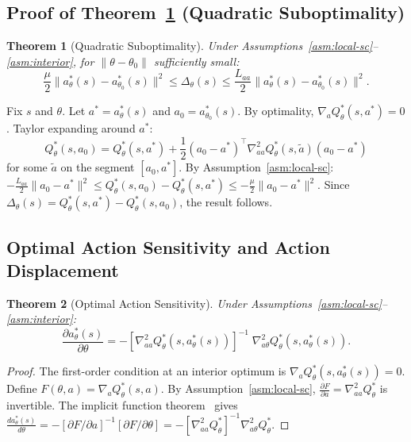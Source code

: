 \documentclass{article}
\newtheorem{theorem}{Theorem}
\begin{document}
\subsection{Proof of Theorem~\ref{thm:quadratic-subopt} (Quadratic Suboptimality)}

\begin{theorem}[Quadratic Suboptimality]
\label{thm:quadratic-subopt}
Under Assumptions~\ref{asm:local-sc}--\ref{asm:interior}, for $\|\theta - \theta_0\|$ sufficiently small:
\[
\frac{\mu}{2}\|a^*_{\theta}(s) - a^*_{\theta_0}(s)\|^2 \leq \Delta_{\theta}(s) \leq \frac{L_{aa}}{2}\|a^*_{\theta}(s) - a^*_{\theta_0}(s)\|^2.
\]
\end{theorem}

Fix $s$ and $\theta$. Let $a^* = a^*_{\theta}(s)$ and $a_0 = a^*_{\theta_0}(s)$. By optimality, $\nabla_a Q^*_{\theta}(s, a^*) = 0$. Taylor expanding around $a^*$:
\begin{equation}
Q^*_{\theta}(s, a_0) = Q^*_{\theta}(s, a^*) + \frac{1}{2}(a_0 - a^*)^\top \nabla^2_{aa}Q^*_{\theta}(s, \tilde{a})(a_0 - a^*)
\end{equation}
for some $\tilde{a}$ on the segment $[a_0, a^*]$. By Assumption~\ref{asm:local-sc}:
$-\frac{L_{aa}}{2}\|a_0 - a^*\|^2 \leq Q^*_{\theta}(s, a_0) - Q^*_{\theta}(s, a^*) \leq -\frac{\mu}{2}\|a_0 - a^*\|^2$.
Since $\Delta_{\theta}(s) = Q^*_{\theta}(s, a^*) - Q^*_{\theta}(s, a_0)$, the result follows.

\subsection{Optimal Action Sensitivity and Action Displacement}

\begin{theorem}[Optimal Action Sensitivity]
\label{thm:action-sensitivity}
Under Assumptions~\ref{asm:local-sc}--\ref{asm:interior}:
\[
\frac{\partial a^*_\theta(s)}{\partial\theta} = -[\nabla^2_{aa}Q^*_\theta(s, a^*_\theta(s))]^{-1}\;\nabla^2_{a\theta}Q^*_\theta(s, a^*_\theta(s)).
\]
\end{theorem}
\begin{proof}
The first-order condition at an interior optimum is $\nabla_a Q^*_\theta(s, a^*_\theta(s)) = 0$. Define $F(\theta, a) = \nabla_a Q^*_\theta(s, a)$. By Assumption~\ref{asm:local-sc}, $\frac{\partial F}{\partial a} = \nabla^2_{aa}Q^*_\theta$ is invertible. The implicit function theorem~\citep{krantz2002implicit} gives $\frac{da^*_\theta(s)}{d\theta} = -[\partial F/\partial a]^{-1}[\partial F/\partial\theta] = -[\nabla^2_{aa}Q^*_\theta]^{-1}\nabla^2_{a\theta}Q^*_\theta$.
\end{proof}
\end{document}
